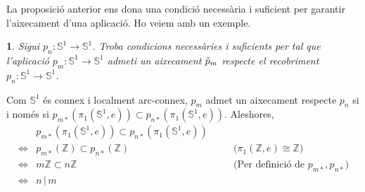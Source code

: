 \documentclass[compress,10pt]{article}
\newtheorem{enunciat}{}
\theoremstyle{definition}
\begin{document}
La proposició anterior ens dona una condició necessària i suficient per garantir l'aixecament d'una aplicació. Ho veiem amb un exemple.
\begin{enunciat}
    Sigui $p_{n}:\mathbb{S}^{1}\rightarrow\mathbb{S}^{1}$. Troba condicions necessàries i suficients per tal que l'aplicació $p_{m}:\mathbb{S}^{1}\rightarrow\mathbb{S}^{1}$ admeti un aixecament $\Tilde{p}_{m}$ respecte el recobriment $p_{n}:\mathbb{S}^{1}\rightarrow\mathbb{S}^{1}$.
\end{enunciat}
Com $\mathbb{S}^{1}$ és connex i localment arc-connex, $p_{m}$ admet un aixecament respecte $p_{n}$ si i només si $p_{m*}(\pi_{1}(\mathbb{S}^{1},e))\subset p_{n*}(\pi_{1}(\mathbb{S}^{1},e))$. Aleshores,
\begin{align*}
    &p_{m*}(\pi_{1}(\mathbb{S}^{1},e))\subset p_{n*}(\pi_{1}(\mathbb{S}^{1},e))
    &&\\
    \iff
    &p_{m*}(\mathbb{Z})\subset p_{n*}(\mathbb{Z})
    &\quad&\textrm{($\pi_{1}(\mathbb{Z},e)\cong\mathbb{Z}$)}\\
    \iff
    &m\mathbb{Z}\subset n\mathbb{Z}
    &\quad&\textrm{(Per definició de $p_{m*},p_{n*}$)}\\
    \iff
    &n\,|\, m
\end{align*}
\appendix
\end{document}
